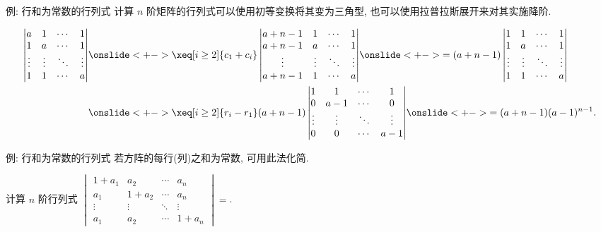 \begin{frame}{例: 行和为常数的行列式}
	\onslide<+->
	计算 $n$ 阶矩阵的行列式可以使用初等变换将其变为三角型, 也可以使用拉普拉斯展开来对其实施降阶.
	\onslide<+->
	\begin{example}
		\begin{align*}
			\begin{vmatrix}
				a&1&\cdots&1\\
				1&a&\cdots&1\\
				\vdots&\vdots&\ddots&\vdots\\
				1&1&\cdots&a
			\end{vmatrix}
		&\onslide<+->{\xeq[i\ge2]{c_1+c_i}\begin{vmatrix}
				a+n-1&1&\cdots&1\\
				a+n-1&a&\cdots&1\\
				\vdots&\vdots&\ddots&\vdots\\
				a+n-1&1&\cdots&a
			\end{vmatrix}}
		\onslide<+->{=(a+n-1)\begin{vmatrix}
				1&1&\cdots&1\\
				1&a&\cdots&1\\
				\vdots&\vdots&\ddots&\vdots\\
				1&1&\cdots&a
			\end{vmatrix}}\\
		&\onslide<+->{\xeq[i\ge2]{r_i-r_1}(a+n-1)\begin{vmatrix}
				1&1&\cdots&1\\
				0&a-1&\cdots&0\\
				\vdots&\vdots&\ddots&\vdots\\
				0&0&\cdots&a-1
			\end{vmatrix}}
		\onslide<+->{=(a+n-1)(a-1)^{n-1}.}
		\end{align*}
	\end{example}
\end{frame}


\begin{frame}{例: 行和为常数的行列式}
	\onslide<+->
	若方阵的每行(列)之和为常数, 可用此法化简.
	\onslide<+->
	\begin{exercise}
		计算 $n$ 阶行列式 $\begin{vmatrix}
			1+a_1&a_2&\cdots&a_n\\
			a_1&1+a_2&\cdots&a_n\\
			\vdots&\vdots&\ddots&\vdots\\
			a_1&a_2&\cdots&1+a_n
		\end{vmatrix}=$.
	\end{exercise}
\end{frame}


